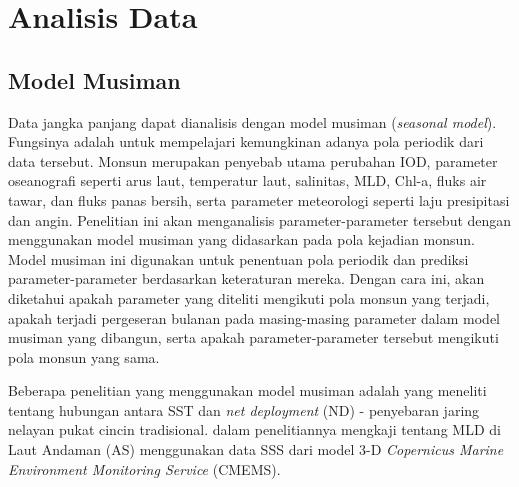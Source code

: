 \section[Analisis Data]{Analisis Data}
\begin{spacing}{1.5}
	\subsection[Model Musiman]{Model Musiman}

	Data jangka panjang dapat dianalisis dengan model musiman (\textit{seasonal model}). Fungsinya adalah untuk mempelajari kemungkinan adanya pola periodik dari data tersebut. Monsun merupakan penyebab utama perubahan IOD, parameter oseanografi seperti arus laut, temperatur laut, salinitas, MLD, Chl-a, fluks air tawar, dan fluks panas bersih, serta parameter meteorologi seperti laju presipitasi dan angin. Penelitian ini akan menganalisis parameter-parameter tersebut dengan menggunakan model musiman yang didasarkan pada pola kejadian monsun. Model musiman ini digunakan untuk penentuan pola periodik dan prediksi parameter-parameter berdasarkan keteraturan mereka. Dengan cara ini, akan diketahui apakah parameter yang diteliti mengikuti pola monsun yang terjadi, apakah terjadi pergeseran bulanan pada masing-masing parameter dalam model musiman yang dibangun, serta apakah parameter-parameter tersebut mengikuti pola monsun yang sama.

	Beberapa penelitian yang menggunakan model musiman adalah  \citeyear{Haridhi2016} yang meneliti tentang hubungan antara SST dan \textit{net deployment} (ND) - penyebaran jaring nelayan pukat cincin tradisional.  \citeyear{Ikhwan2022} dalam penelitiannya mengkaji tentang MLD di Laut Andaman (AS) menggunakan data SSS dari model 3-D \textit{Copernicus Marine Environment Monitoring Service} (CMEMS).  
	

\end{spacing}
